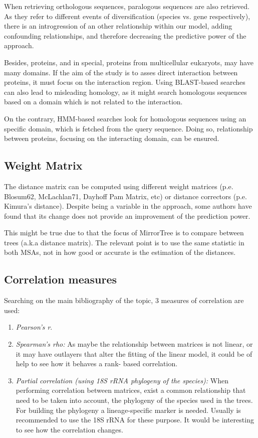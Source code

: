 \documentclass[11pt]{article}
\begin{document}
When retrieving orthologous sequences, paralogous sequences are also retrieved. As they refer to different events of diversification (species vs. gene respectively), there is an introgression of an other relationship within our model, adding confounding relationships, and therefore decreasing the predictive power of the approach.

Besides, proteins, and in special, proteins from multicellular eukaryots, may have many domains. If the aim of the study is to asses direct interaction between proteins, it must focus on the interaction region. Using BLAST-based searches can also lead to misleading homology, as it might search homologous sequences based on a domain which is not related to the interaction.

On the contrary, HMM-based searches look for homologous sequences using an specific domain, which is fetched from the query sequence. Doing so, relationship between proteins, focusing on the interacting domain, can be ensured.


\subsection{Weight Matrix}
The distance matrix can be computed using different weight matrices (p.e. Blosum62, McLachlan71, Dayhoff Pam Matrix, etc) or distance correctors (p.e. Kimura's distance). Despite being a variable in the approach, some authors\cite{Zhou13} have found that its change does not provide an improvement of the prediction power.

This might be true due to that the focus of MirrorTree is to compare between trees (a.k.a distance matrix). The relevant point is to use the same statistic in both MSAs, not in how good or accurate is the estimation of the distances.

\subsection{Correlation measures}
Searching on the main bibliography of the topic, 3 measures of correlation are used:

\begin{enumerate}
\setlength{\itemsep}{1pt}
	\item \textit{Pearson's r}\cite{Pazos2001}.
	\item \textit{Spearman's rho:} As maybe the relationship between matrices is not linear, or it may have 		outlayers that alter the fitting of the linear model, it could be of help to see how it behaves a rank-		based correlation.
	\item \textit{Partial correlation (using 18S rRNA phylogeny of the species):}\cite{Sato2005} When 			performing correlation between matrices, exist a common relationship that need to be taken into account, 		the phylogeny of the species used in the trees. For building the phylogeny a lineage-specific marker is 		needed. Usually is recommended to use the 18S rRNA for these purpose\cite{Sato2005}. It would be 				interesting to see how the correlation changes.
\end{enumerate}
\end{document}
